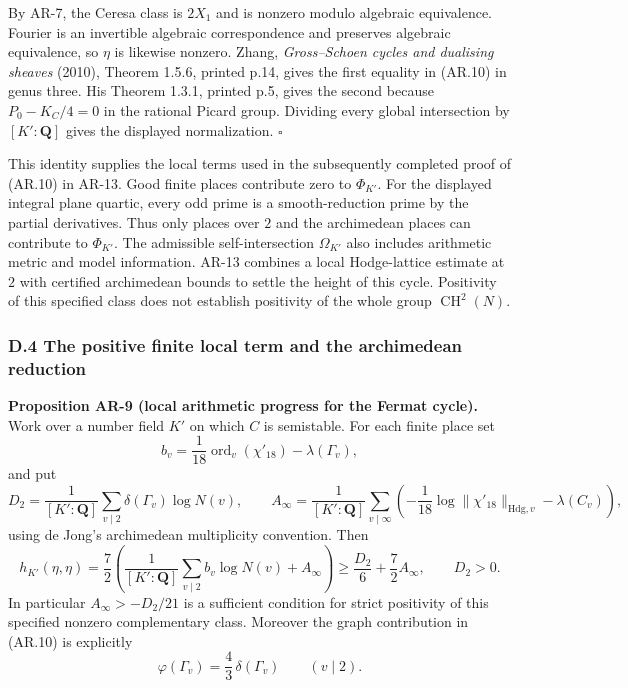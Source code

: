 By AR-7, the Ceresa class is \(2X_1\) and is nonzero modulo algebraic
equivalence. Fourier is an invertible algebraic correspondence and
preserves algebraic equivalence, so \(\eta\) is likewise nonzero. Zhang,
\emph{Gross--Schoen cycles and dualising sheaves} (2010), Theorem 1.5.6,
printed p.14, gives the first equality in (AR.10) in genus three. His
Theorem 1.3.1, printed p.5, gives the second because \(P_0-K_C/4=0\) in
the rational Picard group. Dividing every global intersection by
\([K':\mathbf Q]\) gives the displayed normalization. \(\square\)

This identity supplies the local terms used in the subsequently
completed proof of (AR.10) in AR-13. Good finite places contribute zero
to \(\Phi_{K'}\). For the displayed integral plane quartic, every odd
prime is a smooth-reduction prime by the partial derivatives. Thus only
places over \(2\) and the archimedean places can contribute to
\(\Phi_{K'}\). The admissible self-intersection \(\Omega_{K'}\) also
includes arithmetic metric and model information. AR-13 combines a local
Hodge-lattice estimate at \(2\) with certified archimedean bounds to
settle the height of this cycle. Positivity of this specified class does
not establish positivity of the whole group \(\operatorname{CH}^2(N)\).

\subsubsection{D.4 The positive finite local term and the archimedean
reduction}\label{d.4-the-positive-finite-local-term-and-the-archimedean-reduction}

\textbf{Proposition AR-9 (local arithmetic progress for the Fermat
cycle).} Work over a number field \(K'\) on which \(C\) is semistable.
For each finite place set \[
b_v=\frac1{18}\operatorname{ord}_v(\chi'_{18})-\lambda(\Gamma_v),
\] and put \[
D_2=\frac1{[K':\mathbf Q]}\sum_{v\mid2}\delta(\Gamma_v)\log N(v),\qquad
A_\infty=\frac1{[K':\mathbf Q]}\sum_{v\mid\infty}
\left(-\frac1{18}\log\|\chi'_{18}\|_{\mathrm{Hdg},v}-\lambda(C_v)\right),
\] using de Jong's archimedean multiplicity convention. Then \[
h_{K'}(\eta,\eta)
 =\frac72\left(
  \frac1{[K':\mathbf Q]}\sum_{v\mid2}b_v\log N(v)+A_\infty
 \right)
 \ge\frac{D_2}{6}+\frac72 A_\infty,\qquad D_2>0.
\tag{AR.12}
\] In particular \(A_\infty>-D_2/21\) is a sufficient condition for
strict positivity of this specified nonzero complementary class.
Moreover the graph contribution in (AR.10) is explicitly \[
\varphi(\Gamma_v)=\frac43\,\delta(\Gamma_v)\qquad(v\mid2).
\tag{AR.13}
\]

